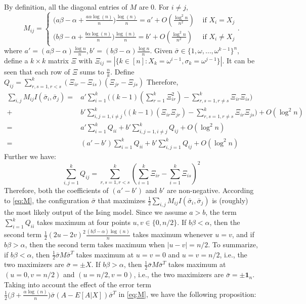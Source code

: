\documentclass{article}
\begin{document}
By definition, all the diagonal entries of $M$ are $0$.
For $i\neq j$, 
$$
M_{ij}=\left\{ 
\begin{array}{cc}
 \big(a\beta-\alpha+\frac{a\alpha\log(n)}{n} \big) \frac{\log(n)}{n} = a' + O(\frac{\log^2 n}{n^2})
   & \text{~if~} X_i=X_j \\
  \big(b\beta-\alpha+\frac{b\alpha\log(n)}{n} \big) \frac{\log(n)}{n} = b' + O(\frac{\log^2 n}{n^2})
   & \text{~if~} X_i\neq X_j
\end{array}
\right. .
$$
where $a' =(a\beta - \alpha) \frac{\log n }{n}, b'=(b\beta - \alpha) \frac{\log n}{n}$.
Given $\bar{\sigma}\in\{1, \omega, \dots, \omega^{k-1}\}^n$, define a $k\times k$ matrix $\Xi$ with 
$\Xi_{ij} = |\{k \in [n]: X_k = \omega^{i-1}, \sigma_k = \omega^{j-1}\}|$. It can be seen that each row of $\Xi$ sums to $\frac{n}{k}$. Define $Q_{ij} = \sum_{r,s=1, r<s}^k (\Xi_{ir} - \Xi_{is})(\Xi_{jr} - \Xi_{js})$
Therefore,
\begin{equation} \label{eq:sMs}
\begin{aligned}
 \sum_{i,j}M_{ij}I(\bar{\sigma}_i, \bar{\sigma}_j)
= & a'\sum_{i=1}^k \big( (k-1)(\sum_{r=1}^k \Xi_{ir}^2) - \sum_{r,s=1,r \neq s}^k \Xi_{ir}\Xi_{is} \big) \\
+ & b'\sum_{i,j=1, i\neq j}^k  \big( (k-1)  (\Xi_{ir} \Xi_{jr}) - \sum_{r,s=1,r \neq s}^k \Xi_{ir}\Xi_{js}  \big) + O(\log^2 n)\\
= & a' \sum_{i=1}^k Q_{ii} + b' \sum_{i,j=1,i\neq j}^k Q_{ij} + O(\log^2 n ) \\
 = & ( a' - b') \sum_{i=1}^k Q_{ii} + b' \sum_{i,j=1}^k Q_{ij} + O(\log^2 n ) 
\end{aligned}
\end{equation}
Further we have:
$$
\sum_{i,j=1}^k Q_{ij} = \sum_{r,s=1, r<s}^k (\sum_{i=1}^k \Xi_{ir} - \sum_{i=1}^k \Xi_{is})^2
$$
Therefore, both the coefficients of $(a'-b')$ and $b'$ are non-negative.
According to \eqref{eq:M}, the configuration $\bar{\sigma}$ that maximizes $\frac{1}{2}\sum_{i,j} M_{ij} I(\bar{\sigma}_i, \bar{\sigma}_j)$ is (roughly) the most likely output of the Ising model.
Since we assume $a>b$, the term $\sum_{i=1}^k Q_{ii}$ takes maximum at four points $u,v\in\{0,n/2\}$. If $b\beta<\alpha$, then the second term $\frac{1}{2} (2u-2v)^2
\frac{(b\beta-\alpha)\log(n)}{n}$ takes maximum whenever $u=v$, and if $b\beta>\alpha$, then the second term takes maximum when $|u-v|=n/2$.
To summarize, if $b\beta<\alpha$, then $\frac{1}{2}\bar{\sigma} M \bar{\sigma}^T$ takes maximum at $u=v=0$ and $u=v=n/2$, i.e., the two maximizers are $\bar{\sigma}=\pm X$. If $b\beta>\alpha$, then $\frac{1}{2}\bar{\sigma} M \bar{\sigma}^T$ takes maximum at $(u=0,v=n/2)$ and $(u=n/2,v=0)$, i.e., the two maximizers are $\bar{\sigma}=\pm \mathbf{1}_n$.
Taking into account the effect of the error term $\frac{1}{2} \big(\beta+\frac{\alpha\log(n)}{n} \big) \bar{\sigma}  (A-E[A|X])
  \bar{\sigma}^T$ in \eqref{eq:M}, we have the following proposition:
\end{document}
